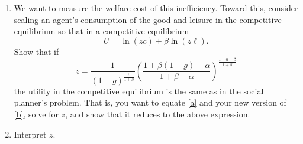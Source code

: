 \documentclass{article}
\begin{document}
\begin{enumerate}
\begin{enumerate}
\item We want to measure the welfare cost of this inefficiency. Toward this,
consider scaling an agent's consumption of the good and leisure in the
competitive equilibrium so that in a competitive equilibrium 
\begin{equation*}
U=\ln \left( zc\right) +\beta \ln \left( z\ell \right) .
\end{equation*}%
Show that if 
\begin{equation*}
z=\frac{1}{\left( 1-g\right) ^{\frac{\beta }{1+\beta }}}\left( \frac{1+\beta
\left( 1-g\right) -\alpha }{1+\beta -\alpha }\right) ^{\frac{1-\alpha +\beta 
}{1+\beta }}
\end{equation*}%
the utility in the competitive equilibrium is the same as in the social
planner's problem. That is, you want to equate \ref{a} and your new version
of \ref{b}, solve for $z$, and show that it reduces to the above expression$%
. $

\item Interpret $z.$
\end{enumerate}

\pagebreak
\end{enumerate}
\end{document}
